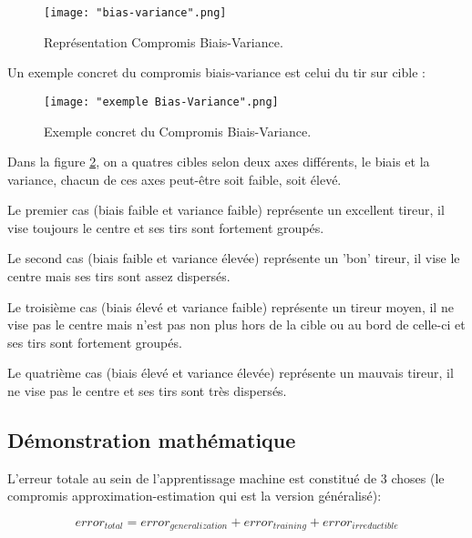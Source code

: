 \documentclass[a4paper]{article}
\begin{document}
\begin{figure}[!h]
	\centering
	\texttt{[image: "bias-variance".png]}
	\caption{Représentation Compromis Biais-Variance. \cite{ReconcilingModernML}}
	\label{Bias-Variance}
\end{figure}

\newpage

Un exemple concret du compromis biais-variance est celui du tir sur cible :

\begin{figure}[!h]
	\centering
	\texttt{[image: "exemple Bias-Variance".png]}
	\caption{Exemple concret du Compromis Biais-Variance. \cite{UnderstandingBiasVarianceTradeoff}}
	\label{ConcreteExample}
\end{figure}

Dans la figure \ref{ConcreteExample}, on a quatres cibles selon deux axes différents, le biais et la variance, chacun de ces axes peut-être soit faible, soit élevé. \par

Le premier cas (biais faible et variance faible) représente un excellent tireur, il vise toujours le centre et ses tirs sont fortement groupés. \par

Le second cas (biais faible et variance élevée) représente un 'bon' tireur, il vise le centre mais ses tirs sont assez dispersés. \par

Le troisième cas (biais élevé et variance faible) représente un tireur moyen, il ne vise pas le centre mais n'est pas non plus hors de la cible ou au bord de celle-ci et ses tirs sont fortement groupés. \par

Le quatrième cas (biais élevé et variance élevée) représente un mauvais tireur, il ne vise pas le centre et ses tirs sont très dispersés. \par

\newpage

\subsection{Démonstration mathématique}

L'erreur totale au sein de l'apprentissage machine est constitué de 3 choses (le compromis approximation-estimation qui est la version généralisé): \newline

\[ error_{total} = error_{generalization} + error_{training} + error_{irreductible} \]
\end{document}
